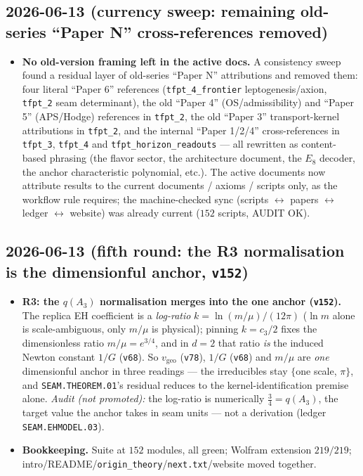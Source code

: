 \documentclass[11pt]{article}
\providecommand{\vref}[1]{\texttt{#1}}
\providecommand{\cthree}{c_3}\providecommand{\phiz}{\varphi_0^{\mathrm{ret}}}
\begin{document}
\subsection*{2026-06-13 (currency sweep: remaining old-series ``Paper N'' cross-references removed)}
\begin{itemize}
\item \textbf{No old-version framing left in the active docs.} A consistency sweep
  found a residual layer of old-series ``Paper N'' attributions and removed them: four
  literal ``Paper 6'' references (\texttt{tfpt\_4\_frontier} leptogenesis/axion,
  \texttt{tfpt\_2} seam determinant), the old ``Paper 4'' (OS/admissibility) and
  ``Paper 5'' (APS/Hodge) references in \texttt{tfpt\_2}, the old ``Paper 3''
  transport-kernel attributions in \texttt{tfpt\_2}, and the internal ``Paper 1/2/4''
  cross-references in \texttt{tfpt\_3}, \texttt{tfpt\_4} and
  \texttt{tfpt\_horizon\_readouts} --- all rewritten as content-based phrasing (the
  flavor sector, the architecture document, the $E_8$ decoder, the anchor characteristic
  polynomial, etc.). The active documents now attribute results to the current
  documents / axioms / scripts only, as the workflow rule requires; the machine-checked
  sync (scripts $\leftrightarrow$ papers $\leftrightarrow$ ledger $\leftrightarrow$
  website) was already current ($152$ scripts, AUDIT OK).
\end{itemize}

\subsection*{2026-06-13 (fifth round: the R3 normalisation is the dimensionful anchor, \vref{v152})}
\begin{itemize}
\item \textbf{R3: the $q(A_3)$ normalisation merges into the one anchor (\vref{v152}).} The
  replica EH coefficient is a \emph{log-ratio} $k=\ln(m/\mu)/(12\pi)$ ($\ln m$ alone is
  scale-ambiguous, only $m/\mu$ is physical); pinning $k=\cthree/2$ fixes the
  dimensionless ratio $m/\mu=e^{3/4}$, and in $d{=}2$ that ratio \emph{is} the induced
  Newton constant $1/G$ (\vref{v68}). So $v_{\mathrm{geo}}$ (\vref{v78}), $1/G$
  (\vref{v68}) and $m/\mu$ are \emph{one} dimensionful anchor in three readings --- the
  irreducibles stay $\{$one scale, $\pi\}$, and \texttt{SEAM.THEOREM.01}'s residual
  reduces to the kernel-identification premise alone. \emph{Audit (not promoted):} the
  log-ratio is numerically $\tfrac34=q(A_3)$, the target value the anchor takes in seam
  units --- not a derivation (ledger \texttt{SEAM.EHMODEL.03}).
\item \textbf{Bookkeeping.} Suite at $152$ modules, all green; Wolfram extension
  $219/219$; intro/README/\texttt{origin\_theory}/\texttt{next.txt}/website moved together.
\end{itemize}
\end{document}
